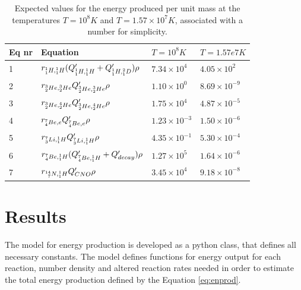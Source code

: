 \documentclass[10pt, nofootinbib, twocolumn]{revtex4-1}
\begin{document}
\begin{center}
\begin{table}[H]
\caption{Expected values for the energy produced per unit mass at the temperatures $T=10^8K$ and $T=1.57\times10^7K$, associated with a number for simplicity. %
}
    \begin{tabular*}{0.5\textwidth}{@{\extracolsep{\fill}}llll}
    \toprule
    \textbf{Eq nr} & \textbf{Equation}  & \textbf{$T=10^8K$} & \textbf{$T=1.57e7K$}\\
    \midrule
    1 & $ r_{\prescript{1}{1}H,\prescript{1}{1}H}(Q'_{\prescript{1}{1}H,\prescript{1}{1}H} +Q'_{\prescript{1}{1}H,\prescript{2}{1}D})\rho$&$7.34\times10^4$&$4.05\times10^2$\\
    2 & $ r_{\prescript{3}{2}He,\prescript{3}{2}He}Q'_{\prescript{3}{2}He,\prescript{3}{2}He}\rho$&$1.10\times 10^0$ &$8.69\times10^{-9}$\\
    3 &  $ r_{\prescript{3}{2}He,\prescript{4}{2}He}Q'_{\prescript{3}{2}He,\prescript{4}{2}He}\rho$&$1.75\times10^4$ &$4.87\times10^{-5}$\\
    4 & $ r_{\prescript{7}{4}Be,e}Q'_{\prescript{7}{4}Be,e}\rho$&$1.23\times 10^{-3}$ &$1.50\times10^{-6}$\\
    5 & $r_{\prescript{7}{3}Li,\prescript{1}{1}H}Q'_{\prescript{7}{3}Li,\prescript{1}{1}H}\rho$&$4.35\times10^{-1}$ &$5.30\times10^{-4}$\\
    6 & $ r_{\prescript{7}{4}Be,\prescript{1}{1}H}(Q'_{\prescript{7}{4}Be,\prescript{1}{1}H} +Q'_{decay})\rho$&$1.27\times10^5$&$1.64\times10^{-6}$\\
    7 & $r_{\prescript{14}{7}N,\prescript{1}{1}H}Q'_{CNO}\rho$&$3.45\times10^4$&$9.18\times10^{-8}$ \\
    \end{tabular*}
    \label{tab:sanity}
\end{table}
\end{center}

\section{Results}\label{sec:results}
The model for energy production is developed as a python class, that defines all necessary constants. The model defines functions for energy output for each reaction, number density and altered reaction rates needed in order to estimate the total energy production defined by the Equation \eqref{eq:enprod}. 
\end{document}
